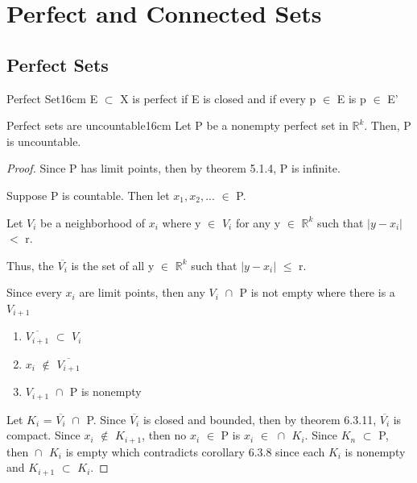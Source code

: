 \newpage

\section[Day 7: Perfect \& Connected Sets]{ Perfect and Connected Sets }

\subsection{ Perfect Sets }

	\begin{definition}{Perfect Set}{16cm}
		E $\subset$ X is {\color{lblue} perfect} if E is closed and
		if every p $\in$ E is p $\in$ E'
	\end{definition}

	\vspace{0.5cm}



	\begin{wtheorem}{Perfect sets are uncountable}{16cm}
		Let P be a nonempty perfect set in $\mathbb{R}^k$.
		Then, P is uncountable.
	\end{wtheorem}

	\begin{proof}
		Since P has limit points, then by {\color{red} theorem 5.1.4},
		P is infinite.

		Suppose P is countable. Then let $x_1, x_2, ...$ $\in$ P.

		Let $V_i$ be a neighborhood of $x_i$ where y $\in$ $V_i$ for any
		y $\in$ $\mathbb{R}^k$ such that $|y-x_i|$ $<$ r.

		Thus, the $\overline{V_i}$ is the set of all y $\in$ $\mathbb{R}^k$
		such that $|y-x_i|$ $\leq$ r.

		Since every $x_i$ are limit points, then any $V_i$ $\cap_{}^{}$ P
		is not empty where there is a $V_{i+1}$

		\begin{enumerate}[label=(\alph*), leftmargin=1cm, itemsep=0.1cm]
			\item $\overline{V_{i+1}}$ $\subset$ $V_i$
			\item $x_i$ $\not \in$ $\overline{V_{i+1}}$
			\item $V_{i+1}$ $\cap_{}^{}$ P is nonempty
		\end{enumerate}

		Let $K_i$ = $\overline{V_i}$ $\cap_{}^{}$ P.
		Since $\overline{V_i}$ is closed and bounded, then by
		{\color{red} theorem 6.3.11}, $\overline{V_i}$ is compact.
		Since $x_i$ $\not \in$ $K_{i+1}$, then no $x_i$ $\in$ P is
		$x_i$ $\in$ $\cap_{}^{}$ $K_i$.
		Since $K_n$ $\subset$ P, then $\cap_{}^{}$ $K_i$ is empty
		which contradicts {\color{orange} corollary 6.3.8 } since
		each $K_i$ is nonempty and $K_{i+1}$ $\subset$ $K_i$.
	\end{proof}



